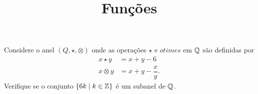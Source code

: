 \documentclass{beamer}
\title{Funções}
\author[\autor]{\autor}
\institute[\instituto]{\instituto}
\date{}
\begin{document}
    \begin{frame}
        \maketitle
    \end{frame}


    \begin{frame}
        \begin{exercicio}
            Considere o anel $(Q, \star, \otimes)$ onde as operações $\star$ e $otimes$ em $\mathbb{Q}$ são definidas por
            \begin{align*}
                x \star y &= x + y - 6\\
                x \otimes y &= x + y - \dfrac{x}{y}.
            \end{align*}
            Verifique se o conjunto $\{6k \mid k \in \mathbb{Z}\}$ é um subanel de $\mathbb{Q}$.
        \end{exercicio}
    \end{frame}
\end{document}
